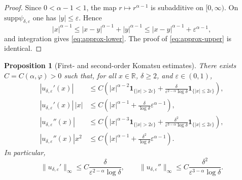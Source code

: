 \documentclass[10pt,a4paper]{amsart}
\newtheorem{proposition}[theorem]{Proposition}
\newcommand{\R}{\mathbb{R}}
\newcommand{\1}{\mathbf{1}}
\newcommand{\eps}{\varepsilon}
\newcommand{\supp}{\mathrm{supp}}
\begin{document}
\begin{proof}
Since $0<\alpha-1<1$, the map $r\mapsto r^{\alpha-1}$ is subadditive on $[0,\infty)$. On $\supp\psi_{\delta,\eps}$ one has $|y|\le\eps$. Hence
\[
  |x|^{\alpha-1}\le |x-y|^{\alpha-1}+|y|^{\alpha-1}\le |x-y|^{\alpha-1}+\eps^{\alpha-1},
\]
and integration gives \eqref{eq:approx-lower}. The proof of \eqref{eq:approx-upper} is identical.
\end{proof}

\begin{proposition}[First- and second-order Komatsu estimates]\label{prop:komatsu}
There exists $C=C(\alpha,\varphi)>0$ such that, for all $x\in\R$, $\delta\ge2$, and $\eps\in(0,1)$,
\begin{align}
|u_{\delta,\eps}'(x)|
&\le C\left(|x|^{\alpha-2}\1_{\{|x|>2\eps\}}
+\frac{\delta}{\eps^{2-\alpha}\log\delta}\1_{\{|x|\le2\eps\}}\right), \label{eq:delta-first}\\
|u_{\delta,\eps}'(x)|\,|x|
&\le C\left(|x|^{\alpha-1}+\frac{\delta}{\log\delta}\eps^{\alpha-1}\right), \label{eq:delta-first-product}\\
|u_{\delta,\eps}''(x)|
&\le C\left(|x|^{\alpha-3}\1_{\{|x|>2\eps\}}
+\frac{\delta^2}{\eps^{3-\alpha}\log\delta}\1_{\{|x|\le2\eps\}}\right), \label{eq:delta-second}\\
|u_{\delta,\eps}''(x)|x^2
&\le C\left(|x|^{\alpha-1}+\frac{\delta^2}{\log\delta}\eps^{\alpha-1}\right). \label{eq:delta-second-product}
\end{align}
In particular,
\begin{equation}\label{eq:global-derivative-bounds}
  \|u_{\delta,\eps}'\|_\infty\le C\frac{\delta}{\eps^{2-\alpha}\log\delta},
  \qquad
  \|u_{\delta,\eps}''\|_\infty\le C\frac{\delta^2}{\eps^{3-\alpha}\log\delta}.
\end{equation}
\end{proposition}
\end{document}
